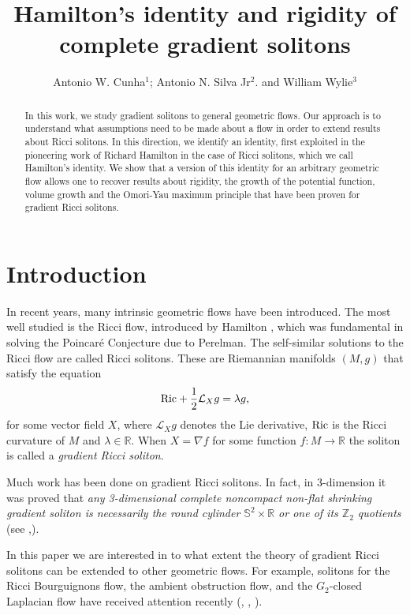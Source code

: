 \documentclass{amsart}
\title[q solitons] {Hamilton's identity and rigidity of complete gradient solitons}
\author[A.W. Cunha, A. N. Silva Jr. and Will Wylie]{Antonio W. Cunha$^{1}$; Antonio N. Silva Jr$^2$. and William Wylie$^3$}
\theoremstyle{plain}
\numberwithin{equation}{section}
\begin{document}
\begin{abstract}
In this work, we study gradient solitons to general geometric flows.  Our approach is to understand what assumptions need to be made about a flow in order to extend results about Ricci solitons.  In this direction,  we identify an identity, first exploited in the pioneering work of Richard  Hamilton in the case of Ricci solitons, which we call Hamilton's identity.  We show that a version of this identity for an arbitrary geometric flow allows one to recover results about rigidity, the growth of the potential function, volume growth and the Omori-Yau maximum principle that have been proven for gradient Ricci solitons. 
\end{abstract}

\maketitle

\section{Introduction}

\noindent

In recent years, many intrinsic geometric flows have been introduced. The most well studied is the Ricci flow, introduced by Hamilton \cite{Hamilton}, which was fundamental in solving the Poincaré Conjecture due to Perelman.  The  self-similar solutions to the Ricci flow are called Ricci solitons. These are Riemannian manifolds $(M, g)$ that satisfy the equation
$${\rm Ric}+ \frac{1}{2}\mathcal{L}_X g=\lambda g,$$
for some vector field $X$, where $\mathcal{L}_X g$ denotes the Lie derivative, ${\rm Ric}$ is the Ricci curvature of $M$ and $\lambda\in\mathbb{R}$. When $X=\nabla f$ for some function $f:M\to\mathbb{R}$ the soliton is called a \emph{gradient Ricci soliton}.  

Much work has been done on gradient Ricci solitons. In fact, in $3$-dimension it was proved that {\em any 3-dimensional complete noncompact non-flat shrinking gradient soliton is necessarily
the round cylinder $\mathbb{S}^2\times\mathbb{R}$ or one of its $\mathbb{Z}_2$ quotients} (see \cite{Cao-Chen-Zhuo},\cite{Wall}). 

In this paper we are interested in to what extent the theory of gradient Ricci solitons can be extended to other geometric flows.  For example, solitons for the Ricci Bourguignons flow, the ambient obstruction flow, and the $G_2$-closed Laplacian flow have received attention recently (\cite{Catino}, \cite{LY}, \cite{Lopez}). 
\end{document}
